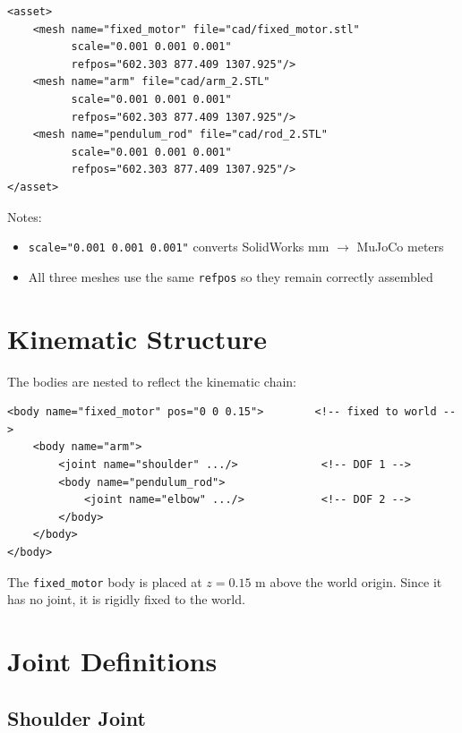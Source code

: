 \documentclass[12pt,a4paper]{article}
\begin{document}
\begin{lstlisting}[style=xml]
<asset>
    <mesh name="fixed_motor" file="cad/fixed_motor.stl"
          scale="0.001 0.001 0.001"
          refpos="602.303 877.409 1307.925"/>
    <mesh name="arm" file="cad/arm_2.STL"
          scale="0.001 0.001 0.001"
          refpos="602.303 877.409 1307.925"/>
    <mesh name="pendulum_rod" file="cad/rod_2.STL"
          scale="0.001 0.001 0.001"
          refpos="602.303 877.409 1307.925"/>
</asset>
\end{lstlisting}

\noindent Notes:
\begin{itemize}
    \item \texttt{scale="0.001 0.001 0.001"} converts SolidWorks mm $\rightarrow$ MuJoCo meters
    \item All three meshes use the same \texttt{refpos} so they remain correctly assembled
\end{itemize}

\section{Kinematic Structure}

The bodies are nested to reflect the kinematic chain:

\begin{lstlisting}[style=xml]
<body name="fixed_motor" pos="0 0 0.15">        <!-- fixed to world -->
    <body name="arm">
        <joint name="shoulder" .../>             <!-- DOF 1 -->
        <body name="pendulum_rod">
            <joint name="elbow" .../>            <!-- DOF 2 -->
        </body>
    </body>
</body>
\end{lstlisting}

\noindent The \texttt{fixed\_motor} body is placed at $z = 0.15$ m above the world origin.
Since it has no joint, it is rigidly fixed to the world.

\section{Joint Definitions}

\subsection{Shoulder Joint}
\end{document}
